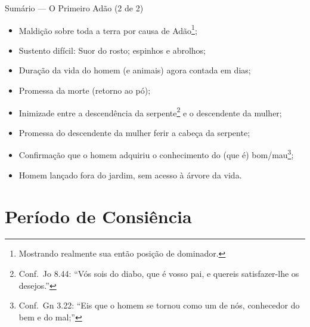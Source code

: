 \documentclass[12pt,aspectratio=169]{beamer}
\newcommand{\RED}[1]{{\textcolor{TXred}{#1}}}
\newcommand{\ORA}[1]{{\textcolor{TXred!50!TXyel}{#1}}}
\newcommand{\GRE}[1]{{\textcolor{TXgre}{#1}}}
\newcommand{\MAG}[1]{{\textcolor{TXmag}{#1}}}
\begin{document}
    \begin{frame}
        \par\noindent\hspace*{0.05\linewidth}%
        \begin{minipage}{0.9\linewidth}%
            \large%
            \begin{alertblock}{Sumário --- O Primeiro Adão (2 de 2)}
                \normalsize
                \begin{itemize}
                    \item<1-> \RED{Maldição} sobre \RED{toda a terra} \ORA{por causa} de
                        Adão\footnote{Mostrando realmente sua então posição de dominador.};
                    \item<1-> \RED{Sustento difícil}: Suor do rosto; espinhos e abrolhos;
                    \item<1-> Duração da vida do homem (e animais) agora \RED{contada em dias};
                    \item<1-> Promessa da \RED{morte} (retorno ao pó);
                    \item<1-> \RED{Inimizade} entre a \RED{descendência da
                        serpente}\footnote{Conf.~Jo 8.44: ``\GRE{Vós sois do diabo, que é vosso
                        pai, e quereis satisfazer-lhe os desejos.}''} e \MAG{o descendente da
                        mulher};
                    \item<1-> Promessa d\MAG{o descendente da mulher} ferir a cabeça da
                        serpente;
                    \item<1-> Confirmação que o homem adquiriu o \RED{conhecimento do (que é)
                        bom/mau}\footnote{Conf.~Gn 3.22: ``\GRE{Eis que o homem se tornou como
                        um de nós, conhecedor do bem e do mal;}''};
                    \item<1-> Homem \RED{lançado fora} do jardim, \RED{sem acesso} à árvore da
                        vida.
                \end{itemize}
            \end{alertblock}
        \end{minipage}%
    \end{frame}

\section{Período de Consiência}
\end{document}
